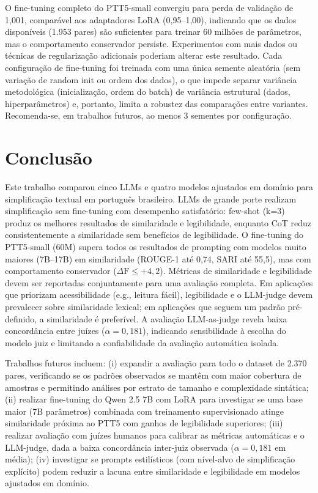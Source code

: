 \documentclass[a4paper, twocolumn, 11pt, twoside]{article}
\begin{document}
O fine-tuning completo do PTT5-small convergiu para perda de validação
de 1,001, comparável aos adaptadores LoRA (0,95--1,00), indicando
que os dados disponíveis (1.953 pares) são suficientes para treinar
60 milhões de parâmetros, mas o comportamento conservador persiste.
Experimentos com mais dados ou técnicas de regularização adicionais
poderiam alterar este resultado. Cada configuração de fine-tuning foi
treinada com uma única semente aleatória (sem variação de random
init ou ordem dos dados), o que impede separar variância
metodológica (inicialização, ordem do batch) de variância
estrutural (dados, hiperparâmetros) e, portanto, limita a
robustez das comparações entre variantes. Recomenda-se, em
trabalhos futuros, ao menos 3 sementes por configuração.

\section{Conclusão}

Este trabalho comparou cinco LLMs e
quatro modelos ajustados em domínio para simplificação textual em português
brasileiro. LLMs de grande porte realizam simplificação sem fine-tuning
com desempenho satisfatório: few-shot (k=3) produz os melhores
resultados de similaridade e legibilidade, enquanto CoT reduz
consistentemente a similaridade sem benefícios de legibilidade.
O fine-tuning do PTT5-small (60M) supera todos os resultados de
prompting com modelos muito maiores (7B--17B) em similaridade
(ROUGE-1 até 0,74, SARI até 55,5), mas com comportamento conservador
($\Delta \mathrm{F} \leq +4,2$). Métricas de similaridade e legibilidade devem
ser reportadas conjuntamente para uma avaliação completa.
Em aplicações que priorizam acessibilidade (e.g., leitura fácil),
legibilidade e o LLM-judge devem prevalecer sobre similaridade
lexical; em aplicações que seguem um padrão pré-definido, a
similaridade é preferível. A avaliação LLM-as-judge revela baixa
concordância entre juízes ($\alpha = 0,181$), indicando
sensibilidade à escolha do modelo juiz e limitando a
confiabilidade da avaliação automática isolada.

Trabalhos futuros incluem: (i) expandir a avaliação para todo o
dataset de 2.370 pares, verificando se os padrões observados se
mantêm com maior cobertura de amostras e permitindo análises por
estrato de tamanho e complexidade sintática; (ii) realizar
fine-tuning do Qwen 2.5 7B com LoRA para investigar se uma base
maior (7B parâmetros) combinada com treinamento supervisionado
atinge similaridade próxima ao PTT5 com ganhos de legibilidade
superiores; (iii) realizar avaliação com juízes humanos
para calibrar as métricas automáticas e o LLM-judge,
dada a baixa concordância inter-juiz observada
($\alpha = 0{,}181$ em média); (iv) investigar se prompts
estilísticos (com nível-alvo de simplificação explícito) podem
reduzir a lacuna entre similaridade e legibilidade em modelos
ajustados em domínio.
\end{document}

